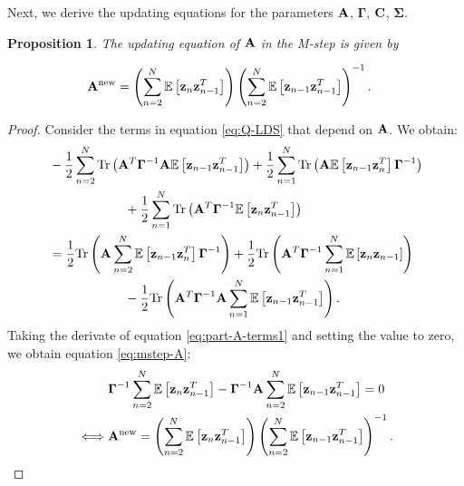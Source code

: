 \documentclass[11pt]{article}
\numberwithin{equation}{section}
\newcommand{\expectation}[1]{\mathbb{E}\left[#1\right]}
\newcommand{\z}{{\bf z}}
\newtheorem{proposition}{Proposition}[section]
\begin{document}
Next, we derive the updating equations for the parameters $\bf A$, $\boldsymbol{\Gamma}$, $\bf C$, $\boldsymbol{\Sigma}$.
\begin{proposition}
	The updating equation of $\bf A$ in the M-step is given by
	
	\begin{align}
		{\bf A}^{\text{\normalfont new}} &= \left(\sum_{n=2}^N \expectation{\z_n \z_{n-1}^T}\right)\left(\sum_{n=2}^N \expectation{\z_{n-1}\z_{n-1}^T}\right)^{-1} \label{eq:mstep-A}.
	\end{align}
\end{proposition}

\begin{proof}
	Consider the terms in equation \eqref{eq:Q-LDS} that depend on $\bf A$. We obtain:
	\begin{align}
		& -\frac{1}{2}\sum_{n=2}^N \text{Tr}\left({\bf A}^T\boldsymbol{\Gamma}^{-1}{\bf A}\expectation{\z_{n-1}\z_{n-1}^T}\right) + \frac{1}{2}\sum_{n=1}^N\text{Tr}\left({\bf A}\expectation{\z_{n-1}\z_n^T}\boldsymbol{\Gamma}^{-1}\right) \nonumber\\
		&\hspace{2.1cm} + \frac{1}{2}\sum_{n=1}^N\text{Tr}\left({\bf A}^T \boldsymbol\Gamma^{-1} \expectation{\z_n\z_{n-1}^T}\right)\\
		&= \frac{1}{2}\text{Tr}\left({\bf A} \sum_{n=2}^N \expectation{\z_{n-1}\z_n^T} \boldsymbol\Gamma^{-1}\right) + \frac{1}{2}\text{Tr}\left({\bf A}^T\boldsymbol\Gamma^{-1} \sum_{n=1}^N\expectation{\z_n\z_{n-1}}\right) \nonumber\\
		&\hspace{2.1cm} - \frac{1}{2}\text{Tr}\left({\bf A}^T \boldsymbol\Gamma^{-1} {\bf A}\sum_{n=1}^N \expectation{\z_{n-1}\z_{n-1}^T}\right)\label{eq:part-A-terms1}.
	\end{align}	
	Taking the derivate of equation \eqref{eq:part-A-terms1} and setting the value to zero, we obtain equation \eqref{eq:mstep-A}:
	\begin{align}
		&\boldsymbol{\Gamma}^{-1} \sum_{n=2}^N \expectation{\z_n\z_{n-1}^T} - \boldsymbol{\Gamma}^{-1} {\bf A} \sum_{n=2}^N\expectation{\z_{n-1}\z_{n-1}^T} = 0\\
		\iff& {\bf A}^{\text{new}} = \left(\sum_{n=2}^N \expectation{\z_n \z_{n-1}^T}\right)\left(\sum_{n=2}^N \expectation{\z_{n-1}\z_{n-1}^T}\right)^{-1}.
	\end{align}
\end{proof}
\end{document}
